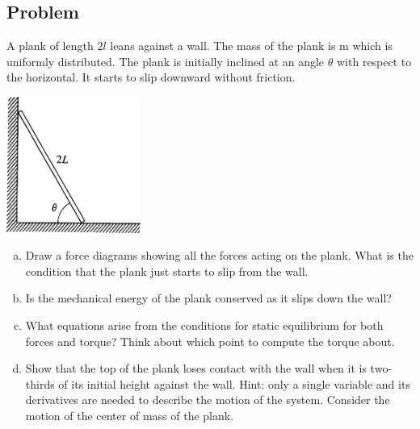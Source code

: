 \documentclass[solutions]{esg8012pset}
\begin{document}
\subsection*{Problem}
  A plank of length $2 l$ leans against a wall. The mass of the plank is m which is uniformly distributed. The plank is initially inclined at an angle $\theta$ with respect to the horizontal. It starts to slip downward without friction.
  \begin{center}\includegraphics[width=0.33\textwidth]{ps09_7}\end{center}
  \begin{enumerate}[(a)]
    \item Draw a force diagrams showing all the forces acting on the plank. What is the condition that the plank just starts to slip from the wall.
    \item Is the mechanical energy of the plank conserved as it slips down the wall?
    \item What equations arise from the conditions for static equilibrium for both forces and torque? Think about which point to compute the torque about.
    \item Show that the top of the plank loses contact with the wall when it is two-thirds of its initial height against the wall. Hint: only a single variable and its derivatives are needed to describe the motion of the system. Consider the motion of the center of mass of the plank.
  \end{enumerate}
\end{document}
